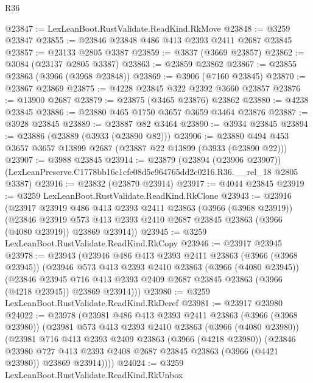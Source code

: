 \begin{lexlean}{R36}
\begin{coremodule}
@23847 := LexLeanBoot.RustValidate.ReadKind.RkMove
@23848 := @3259 @23847
@23855 := @23846 @23848 @486 @413 @2393 @2411 @2687 @23845
@23857 := @23133 @2805 @3387
@23859 := @3837 (@3669 @23857)
@23862 := @3084 (@23137 @2805 @3387)
@23863 := @23859 @23862
@23867 := @23855 @23863 (@3966 (@3968 @23848))
@23869 := @3906 (@7160 @23845)
@23870 := @23867 @23869
@23875 := @4228 @23845 @322 @2392 @3660 @23857
@23876 := @13900 @2687
@23879 := @23875 (@3465 @23876) @23862
@23880 := @4238 @23845
@23886 := @23880 @465 @1750 @3657 @3659 @3464 @23876
@23887 := @3928 @23845
@23889 := @23887 @82 @3464
@23890 := @3934 @23845
@23894 := @23886 (@23889 (@3933 (@23890 @82)))
@23906 := @23880 @494 @453 @3657 @3657 @13899 @2687 (@23887 @22 @13899 (@3933 (@23890 @22)))
@23907 := @3988 @23845
@23914 := @23879
    (@23894 (@23906 @23907))
    (LexLeanPreserve.C1778bb16c1cfe08d5e964765dd2c0216.R36.__rel_18 @2805 @3387)
@23916 := @23832 (@23870 @23914)
@23917 := @4044 @23845
@23919 := @3259 LexLeanBoot.RustValidate.ReadKind.RkClone
@23943 := @23916
    (@23917
      @23919
      @486
      @413
      @2393
      @2411
      @23863
      (@3966 (@3968 @23919))
      (@23846
        @23919
        @573
        @413
        @2393
        @2410
        @2687
        @23845
        @23863
        (@3966 (@4080 @23919))
        @23869
        @23914))
@23945 := @3259 LexLeanBoot.RustValidate.ReadKind.RkCopy
@23946 := @23917 @23945
@23978 := @23943
    (@23946
      @486
      @413
      @2393
      @2411
      @23863
      (@3966 (@3968 @23945))
      (@23946
        @573
        @413
        @2393
        @2410
        @23863
        (@3966 (@4080 @23945))
        (@23846
          @23945
          @716
          @413
          @2393
          @2409
          @2687
          @23845
          @23863
          (@3966 (@4218 @23945))
          @23869
          @23914)))
@23980 := @3259 LexLeanBoot.RustValidate.ReadKind.RkDeref
@23981 := @23917 @23980
@24022 := @23978
    (@23981
      @486
      @413
      @2393
      @2411
      @23863
      (@3966 (@3968 @23980))
      (@23981
        @573
        @413
        @2393
        @2410
        @23863
        (@3966 (@4080 @23980))
        (@23981
          @716
          @413
          @2393
          @2409
          @23863
          (@3966 (@4218 @23980))
          (@23846
            @23980
            @727
            @413
            @2393
            @2408
            @2687
            @23845
            @23863
            (@3966 (@4421 @23980))
            @23869
            @23914))))
@24024 := @3259 LexLeanBoot.RustValidate.ReadKind.RkUnbox

\end{coremodule}
\end{lexlean}
